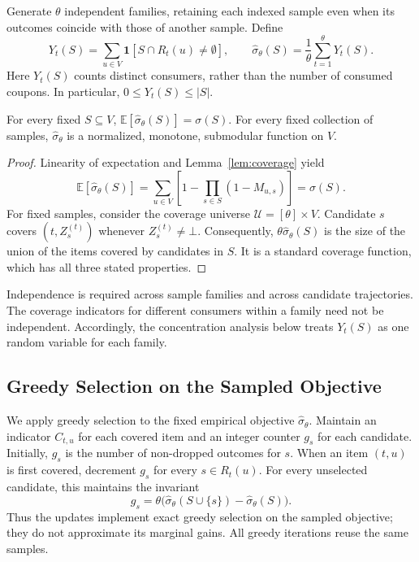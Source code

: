 Generate $\theta$ independent families, retaining each indexed
sample even when its outcomes coincide with those of another sample.
Define
\begin{equation}
\label{eq:empirical-spread}
 Y_t(S)=\sum_{u\in V}\mathbf1[S\cap R_t(u)\ne\emptyset],
 \qquad
 \hat\sigma_\theta(S)=\frac1\theta\sum_{t=1}^\theta Y_t(S).
\end{equation}
Here $Y_t(S)$ counts distinct consumers, rather than the number
of consumed coupons. In particular, $0\le Y_t(S)\le |S|$.

\begin{lemma}
\label{lem:unbiased}
For every fixed $S\subseteq V$,
$\mathbb E[\hat\sigma_\theta(S)]=\sigma(S)$.
For every fixed collection of samples, $\hat\sigma_\theta$ is a
normalized, monotone, submodular function on $V$.
\end{lemma}
\begin{proof}
Linearity of expectation and Lemma~\ref{lem:coverage} yield
\[
 \mathbb E[\hat\sigma_\theta(S)]
 =\sum_{u\in V}\left[1-\prod_{s\in S}(1-M_{u,s})\right]
 =\sigma(S).
\]
For fixed samples, consider the coverage universe
$\mathcal U=[\theta]\times V$. Candidate $s$ covers
$(t,Z_s^{(t)})$ whenever $Z_s^{(t)}\ne\bot$.
Consequently, $\theta\hat\sigma_\theta(S)$ is the size of the
union of the items covered by candidates in $S$.
It is a standard coverage function, which has all three stated
properties.
\end{proof}

Independence is required across sample families and across
candidate trajectories. The coverage indicators for different
consumers within a family need not be independent. Accordingly,
the concentration analysis below treats $Y_t(S)$ as one random
variable for each family.

\subsection{Greedy Selection on the Sampled Objective}
\label{sec:greedy-selection}

We apply greedy selection to the fixed empirical objective
$\hat\sigma_\theta$. Maintain an indicator $C_{t,u}$ for each
covered item and an integer counter $g_s$ for each candidate.
Initially, $g_s$ is the number of non-dropped outcomes for $s$.
When an item $(t,u)$ is first covered, decrement $g_s$ for every
$s\in R_t(u)$. For every unselected candidate, this maintains
the invariant
\[
 g_s=\theta\bigl(\hat\sigma_\theta(S\cup\{s\})
                       -\hat\sigma_\theta(S)\bigr).
\]
Thus the updates implement exact greedy selection on the sampled
objective; they do not approximate its marginal gains.
All greedy iterations reuse the same samples.

